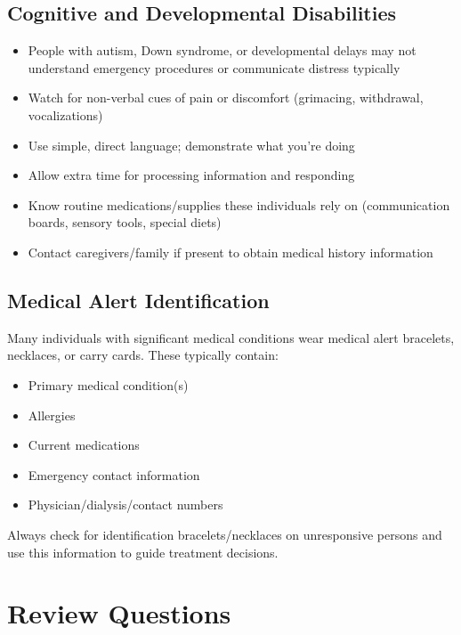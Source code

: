 \subsection{Cognitive and Developmental Disabilities}

\begin{itemize}[leftmargin=*]
  \item People with autism, Down syndrome, or developmental delays may not understand emergency procedures or communicate distress typically
  \item Watch for non-verbal cues of pain or discomfort (grimacing, withdrawal, vocalizations)
  \item Use simple, direct language; demonstrate what you're doing
  \item Allow extra time for processing information and responding
  \item Know routine medications/supplies these individuals rely on (communication boards, sensory tools, special diets)
  \item Contact caregivers/family if present to obtain medical history information
\end{itemize}

\subsection{Medical Alert Identification}

Many individuals with significant medical conditions wear medical alert bracelets, necklaces, or carry cards. These typically contain:

\begin{itemize}[leftmargin=*]
  \item Primary medical condition(s)
  \item Allergies
  \item Current medications
  \item Emergency contact information
  \item Physician/dialysis/contact numbers
\end{itemize}

Always check for identification bracelets/necklaces on unresponsive persons and use this information to guide treatment decisions.

\section{Review Questions}

